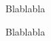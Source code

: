 \documentclass{article}
\begin{document}
Blablabla

\newpage

\printindex
\printindex[toto]
\newpage

Blablabla
\end{document}
